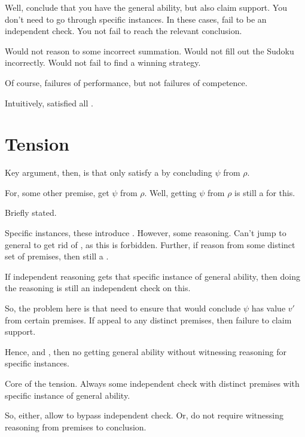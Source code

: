 \begin{note}
  Well, conclude that you have the general ability, but also claim support.
  You don't need to go through specific instances.
  In these cases, fail to be an independent check.
  You not fail to reach the relevant conclusion.

  Would not reason to some incorrect summation.
  Would not fill out the Sudoku incorrectly.
  Would not fail to find a winning strategy.

  Of course, failures of performance, but not failures of competence.

  Intuitively, satisfied all .
\end{note}

\section{Tension}
\label{sec:tension}

\begin{note}
  Key argument, then, is that only satisfy a \requ{} by concluding \(\psi\) from \(\rho\).

  For, some other premise, get \(\psi\) from \(\rho\).
  Well, getting \(\psi\) from \(\rho\) is still a \requ{} for this.
\end{note}

\begin{note}
  Briefly stated.

  Specific instances, these introduce \requ{}.
  However, some reasoning.
  Can't jump to general to get rid of \requ{}, as this is forbidden.
  Further, if reason from some distinct set of premises, then still a \requ{}.

  If independent reasoning gets that specific instance of general ability, then doing the reasoning is still an independent check on this.

  So, the problem here is that need to ensure that would conclude \(\psi\) has value \(v'\) from certain premises.
  If appeal to any distinct premises, then failure to claim support.

  Hence, \ESU{} and \ideaCS{}, then no getting general ability without witnessing reasoning for specific instances.

  Core of the tension.
  Always some independent check with distinct premises with specific instance of general ability.

  So, either, allow to bypass independent check.
  Or, do not require witnessing reasoning from premises to conclusion.
\end{note}

